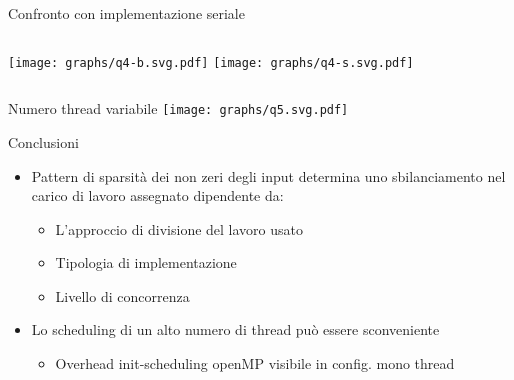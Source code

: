 \begin{frame} {Confronto con implementazione seriale}
\begin{columns}
	\texttt{[image: graphs/q4-b.svg.pdf]}
	\texttt{[image: graphs/q4-s.svg.pdf]}
\end{columns}
\end{frame}
\begin{frame} {Numero thread variabile}
	\centering
	\texttt{[image: graphs/q5.svg.pdf]}
\end{frame}
\begin{frame} {Conclusioni}
\begin{itemize}
	\item	Pattern di sparsità dei non zeri degli input 
	determina uno sbilanciamento nel carico di lavoro assegnato
	dipendente da:
	\pause
	\begin{itemize}
		\item	L'approccio di divisione del lavoro usato
		\item	Tipologia di implementazione
		\item	Livello di concorrenza
	\end{itemize}
	\pause
	\item	Lo scheduling di un alto numero di thread può essere sconveniente
	\begin{itemize}
		\item	Overhead init-scheduling openMP visibile in config. mono thread
	\end{itemize}
	\pause
\end{itemize}
\voidLine
\end{frame}

\appendix
\backupbegin


